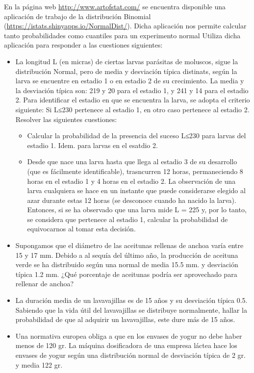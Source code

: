 \documentclass[
]{book}
\providecommand{\tightlist}{%
  \setlength{\itemsep}{0pt}\setlength{\parskip}{0pt}}
\begin{document}
En la página web \url{http://www.artofstat.com/} se encuentra disponible una aplicación de trabajo de la distribución Binomial (\url{https://istats.shinyapps.io/NormalDist/}). Dicha aplicación nos permite calcular tanto probabilidades como cuantiles para un experimento normal Utiliza dicha aplicación para responder a las cuestiones siguientes:

\begin{itemize}
\tightlist
\item
  La longitud L (en micras) de ciertas larvas parásitas de moluscos, sigue la distribución Normal, pero de media y desviación típica distinats, según la larva se encuentre en estadio 1 o en estadio 2 de su crecimiento. La media y la desviación típica son: 219 y 20 para el estadio 1, y 241 y 14 para el estadio 2. Para identificar el estadio en que se encuentra la larva, se adopta el criterio siguiente: Si L≤230 pertenece al estadio 1, en otro caso pertenece al estadio 2. Resolver las siguientes cuestiones:

  \begin{itemize}
  \tightlist
  \item
    Calcular la probabilidad de la presencia del suceso L≤230 para larvas del estadio 1. Idem. para larvas en el esatdio 2.
  \item
    Desde que nace una larva hasta que llega al estadio 3 de su desarrollo (que es fácilmente identificable), trasncurren 12 horas, permaneciendo 8 horas en el estadio 1 y 4 horas en el estadio 2. La observación de una larva cualquiera se hace en un instante que puede considerarse elegido al azar durante estas 12 horas (se desconoce cuando ha nacido la larva). Entonces, si se ha observado que una larva mide L = 225 y, por lo tanto, se considera que pertenece al estadio 1, calcular la probabilidad de equivocarnos al tomar esta decisión.
  \end{itemize}
\item
  Supongamos que el diámetro de las aceitunas rellenas de anchoa varía entre 15 y 17 mm. Debido a al sequía del último año, la producción de aceituna verde se ha distribuido según una normal de media 15.5 mm. y desviación típica 1.2 mm. ¿Qué porcentaje de aceitunas podría ser aprovechado para rellenar de anchoa?
\item
  La duración media de un lavavajillas es de 15 años y su desviación típica 0.5. Sabiendo que la vida útil del lavavajillas se distribuye normalmente, hallar la probabilidad de que al adquirir un lavavajillas, este dure más de 15 años.
\item
  Una normativa europea obliga a que en los envases de yogur no debe haber menos de 120 gr. La máquina dosificadora de una empresa láctea hace los envases de yogur según una distribución normal de desviación típica de 2 gr. y media 122 gr.


\end{itemize}
\end{document}
